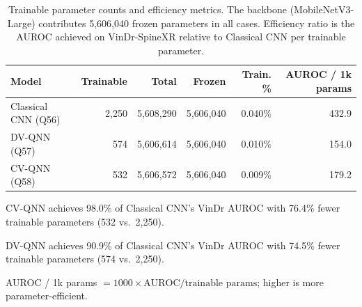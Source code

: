 
\begin{table}[htbp]
\centering
\caption{Trainable parameter counts and efficiency metrics.
  The backbone (MobileNetV3-Large) contributes 5,606,040 frozen parameters in all cases.
  Efficiency ratio is the AUROC achieved on VinDr-SpineXR relative to Classical CNN per trainable parameter.}
\label{tab:parameters}
\begin{tabular}{lrrrrr}
\toprule
\textbf{Model}
  & \textbf{Trainable}
  & \textbf{Total}
  & \textbf{Frozen}
  & \textbf{Train. \%}
  & \textbf{AUROC / 1k params} \\
\midrule
Classical CNN (Q56) & 2{,}250  & 5{,}608{,}290 & 5{,}606{,}040 & 0.040\% & 432.9 \\
DV-QNN (Q57)        & 574      & 5{,}606{,}614 & 5{,}606{,}040 & 0.010\% & 154.0 \\
CV-QNN (Q58)        & 532      & 5{,}606{,}572 & 5{,}606{,}040 & 0.009\% & 179.2 \\
\bottomrule
\end{tabular}
\begin{tablenotes}
\small
\item CV-QNN achieves 98.0\% of Classical CNN's VinDr AUROC with 76.4\% fewer trainable parameters (532 vs.\ 2{,}250).
\item DV-QNN achieves 90.9\% of Classical CNN's VinDr AUROC with 74.5\% fewer trainable parameters (574 vs.\ 2{,}250).
\item AUROC / 1k params $= 1000 \times \text{AUROC} / \text{trainable params}$; higher is more parameter-efficient.
\end{tablenotes}
\end{table}
